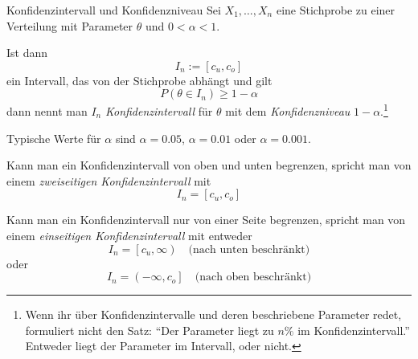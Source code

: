 \begin{defi}{Konfidenzintervall und Konfidenzniveau}
    Sei $X_1, \ldots, X_n$ eine Stichprobe zu einer Verteilung mit Parameter $\theta$ und $0 < \alpha < 1$.

    Ist dann
    \[
        I_n := [ c_u, c_o ]
    \]
    ein Intervall, das von der Stichprobe abhängt und gilt
    \[
        P( \theta \in I_n ) \geq 1 - \alpha
    \]
    dann nennt man $I_n$ \emph{Konfidenzintervall} für $\theta$ mit dem \emph{Konfidenzniveau} $1 - \alpha$.\footnote{Wenn ihr über Konfidenzintervalle und deren beschriebene Parameter redet, formuliert nicht den Satz: \enquote{Der Parameter liegt zu $n\%$ im Konfidenzintervall.} Entweder liegt der Parameter im Intervall, oder nicht.}

    Typische Werte für $\alpha$ sind $\alpha = 0.05$, $\alpha = 0.01$ oder $\alpha = 0.001$.

    Kann man ein Konfidenzintervall von oben und unten begrenzen, spricht man von einem \emph{zweiseitigen Konfidenzintervall} mit
    \[
        I_n = [ c_u, c_o ]
    \]

    Kann man ein Konfidenzintervall nur von einer Seite begrenzen, spricht man von einem \emph{einseitigen Konfidenzintervall} mit entweder
    \[
        I_n = \left[ c_u, \infty \right) \quad \text{(nach unten beschränkt)}
            \]
            oder
            \[
            I_n = \left( -\infty, c_o \right] \quad \text{(nach oben beschränkt)}
    \]
\end{defi}

